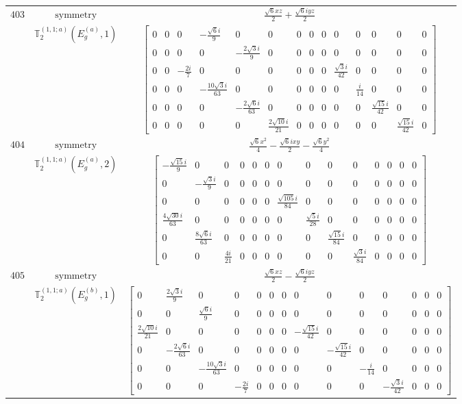 \documentclass[fleqn,8pt,landscape]{jsarticle}
\begin{document}
\begin{longtable}{ccc}
$ 403 $ & $ \text{symmetry} $ & $ \frac{\sqrt{6} x z}{2} + \frac{\sqrt{6} i y z}{2} $ \\
$  $ & $ \mathbb{T}_{2}^{(1,1;a)}(E_{g}^{(a)},1) $ & $ \begin{bmatrix} 0 & 0 & 0 & - \frac{\sqrt{6} i}{9} & 0 & 0 & 0 & 0 & 0 & 0 & 0 & 0 & 0 & 0 \\ 0 & 0 & 0 & 0 & - \frac{2 \sqrt{3} i}{9} & 0 & 0 & 0 & 0 & 0 & 0 & 0 & 0 & 0 \\ 0 & 0 & - \frac{2 i}{7} & 0 & 0 & 0 & 0 & 0 & 0 & \frac{\sqrt{3} i}{42} & 0 & 0 & 0 & 0 \\ 0 & 0 & 0 & - \frac{10 \sqrt{3} i}{63} & 0 & 0 & 0 & 0 & 0 & 0 & \frac{i}{14} & 0 & 0 & 0 \\ 0 & 0 & 0 & 0 & - \frac{2 \sqrt{6} i}{63} & 0 & 0 & 0 & 0 & 0 & 0 & \frac{\sqrt{15} i}{42} & 0 & 0 \\ 0 & 0 & 0 & 0 & 0 & \frac{2 \sqrt{10} i}{21} & 0 & 0 & 0 & 0 & 0 & 0 & \frac{\sqrt{15} i}{42} & 0 \end{bmatrix} $ \\ \hline
$ 404 $ & $ \text{symmetry} $ & $ \frac{\sqrt{6} x^{2}}{4} - \frac{\sqrt{6} i x y}{2} - \frac{\sqrt{6} y^{2}}{4} $ \\
$  $ & $ \mathbb{T}_{2}^{(1,1;a)}(E_{g}^{(a)},2) $ & $ \begin{bmatrix} - \frac{\sqrt{15} i}{9} & 0 & 0 & 0 & 0 & 0 & 0 & 0 & 0 & 0 & 0 & 0 & 0 & 0 \\ 0 & - \frac{\sqrt{3} i}{9} & 0 & 0 & 0 & 0 & 0 & 0 & 0 & 0 & 0 & 0 & 0 & 0 \\ 0 & 0 & 0 & 0 & 0 & 0 & \frac{\sqrt{105} i}{84} & 0 & 0 & 0 & 0 & 0 & 0 & 0 \\ \frac{4 \sqrt{30} i}{63} & 0 & 0 & 0 & 0 & 0 & 0 & \frac{\sqrt{5} i}{28} & 0 & 0 & 0 & 0 & 0 & 0 \\ 0 & \frac{8 \sqrt{6} i}{63} & 0 & 0 & 0 & 0 & 0 & 0 & \frac{\sqrt{15} i}{84} & 0 & 0 & 0 & 0 & 0 \\ 0 & 0 & \frac{4 i}{21} & 0 & 0 & 0 & 0 & 0 & 0 & \frac{\sqrt{3} i}{84} & 0 & 0 & 0 & 0 \end{bmatrix} $ \\ \hline
$ 405 $ & $ \text{symmetry} $ & $ \frac{\sqrt{6} x z}{2} - \frac{\sqrt{6} i y z}{2} $ \\
$  $ & $ \mathbb{T}_{2}^{(1,1;a)}(E_{g}^{(b)},1) $ & $ \begin{bmatrix} 0 & \frac{2 \sqrt{3} i}{9} & 0 & 0 & 0 & 0 & 0 & 0 & 0 & 0 & 0 & 0 & 0 & 0 \\ 0 & 0 & \frac{\sqrt{6} i}{9} & 0 & 0 & 0 & 0 & 0 & 0 & 0 & 0 & 0 & 0 & 0 \\ \frac{2 \sqrt{10} i}{21} & 0 & 0 & 0 & 0 & 0 & 0 & - \frac{\sqrt{15} i}{42} & 0 & 0 & 0 & 0 & 0 & 0 \\ 0 & - \frac{2 \sqrt{6} i}{63} & 0 & 0 & 0 & 0 & 0 & 0 & - \frac{\sqrt{15} i}{42} & 0 & 0 & 0 & 0 & 0 \\ 0 & 0 & - \frac{10 \sqrt{3} i}{63} & 0 & 0 & 0 & 0 & 0 & 0 & - \frac{i}{14} & 0 & 0 & 0 & 0 \\ 0 & 0 & 0 & - \frac{2 i}{7} & 0 & 0 & 0 & 0 & 0 & 0 & - \frac{\sqrt{3} i}{42} & 0 & 0 & 0 \end{bmatrix} $ \\ \hline

\end{longtable}
\end{document}
